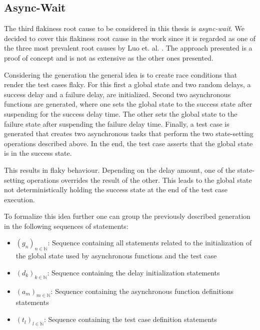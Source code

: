\documentclass[
fancyheadings, %
%
%
]{stsreprt}
\begin{document}
\subsection{Async-Wait}
The third flakiness root cause to be considered in this thesis is \textit{async-wait}. 
We decided to cover this flakiness root cause in the work since it is regarded as one of the three most prevalent root causes by Luo et. al. \cite{luo:2014}.
The approach presented is a proof of concept and is not as extensive as the other ones presented. \par 

Considering the generation the general idea is to create race conditions that render the test cases flaky. 
For this first a global state and two random delays, a success delay and a failure delay, are initialized.
Second two asynchronous functions are generated, where one sets the global state to the success state after suspending for the success delay time. 
The other sets the global state to the failure state after suspending the failure delay time. 
Finally, a test case is generated that creates two asynchronous tasks that perform the two state-setting operations described above. 
In the end, the test case asserts that the global state is in the success state. \par 
This results in flaky behaviour.
Depending on the delay amount, one of the state-setting operations overrides the result of the other.
This leads to the global state not deterministically holding the success state at the end of the test case execution. \par 

To formalize this idea further one can group the previously described generation in the following sequences of statements: 

\begin{itemize}
    \item $(g_n)_{n \in \mathbb{N}}$: Sequence containing all statements related to the initialization of the global state used by asynchronous functions and the test case
    \item $(d_k)_{k \in \mathbb{N}}$: Sequence containing the delay initialization statements
    \item $(a_m)_{m \in \mathbb{N}}$: Sequence containing the asynchronous function definitions statements
    \item $(t_l)_{l \in \mathbb{N}}$: Sequence containing the test case definition statements
\end{itemize}
\end{document}
